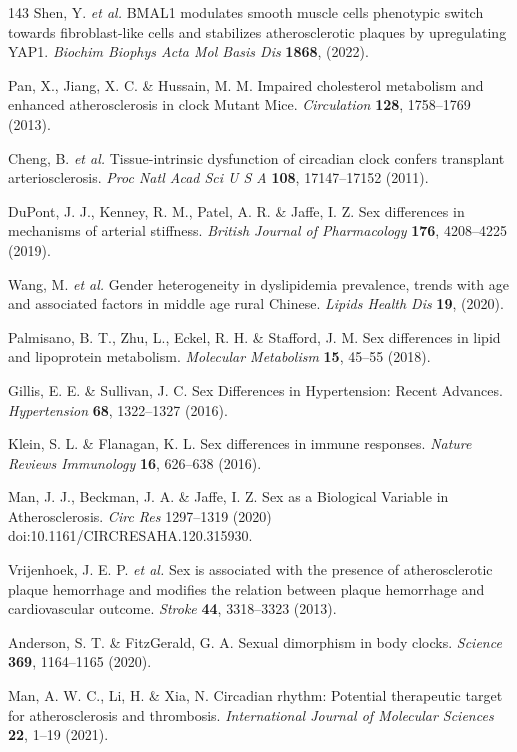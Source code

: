 \documentclass[12pt]{article}
\begin{document}
\begin{thebibliography}{143}
 Shen, Y. \textit{et al.} BMAL1 modulates smooth muscle cells phenotypic switch towards fibroblast-like cells and stabilizes atherosclerotic plaques by upregulating YAP1. \textit{Biochim Biophys Acta Mol Basis Dis} \textbf{1868}, (2022).

 Pan, X., Jiang, X. C. \& Hussain, M. M. Impaired cholesterol metabolism and enhanced atherosclerosis in clock Mutant Mice. \textit{Circulation} \textbf{128}, 1758--1769 (2013).

 Cheng, B. \textit{et al.} Tissue-intrinsic dysfunction of circadian clock confers transplant arteriosclerosis. \textit{Proc Natl Acad Sci U S A} \textbf{108}, 17147--17152 (2011).

 DuPont, J. J., Kenney, R. M., Patel, A. R. \& Jaffe, I. Z. Sex differences in mechanisms of arterial stiffness. \textit{British Journal of Pharmacology} \textbf{176}, 4208--4225 (2019).

 Wang, M. \textit{et al.} Gender heterogeneity in dyslipidemia prevalence, trends with age and associated factors in middle age rural Chinese. \textit{Lipids Health Dis} \textbf{19}, (2020).

 Palmisano, B. T., Zhu, L., Eckel, R. H. \& Stafford, J. M. Sex differences in lipid and lipoprotein metabolism. \textit{Molecular Metabolism} \textbf{15}, 45--55 (2018).

 Gillis, E. E. \& Sullivan, J. C. Sex Differences in Hypertension: Recent Advances. \textit{Hypertension} \textbf{68}, 1322--1327 (2016).

 Klein, S. L. \& Flanagan, K. L. Sex differences in immune responses. \textit{Nature Reviews Immunology} \textbf{16}, 626--638 (2016).

 Man, J. J., Beckman, J. A. \& Jaffe, I. Z. Sex as a Biological Variable in Atherosclerosis. \textit{Circ Res} 1297--1319 (2020) doi:10.1161/CIRCRESAHA.120.315930.

 Vrijenhoek, J. E. P. \textit{et al.} Sex is associated with the presence of atherosclerotic plaque hemorrhage and modifies the relation between plaque hemorrhage and cardiovascular outcome. \textit{Stroke} \textbf{44}, 3318--3323 (2013).

 Anderson, S. T. \& FitzGerald, G. A. Sexual dimorphism in body clocks. \textit{Science} \textbf{369}, 1164--1165 (2020).

 Man, A. W. C., Li, H. \& Xia, N. Circadian rhythm: Potential therapeutic target for atherosclerosis and thrombosis. \textit{International Journal of Molecular Sciences} \textbf{22}, 1--19 (2021).


\end{thebibliography}
\end{document}

